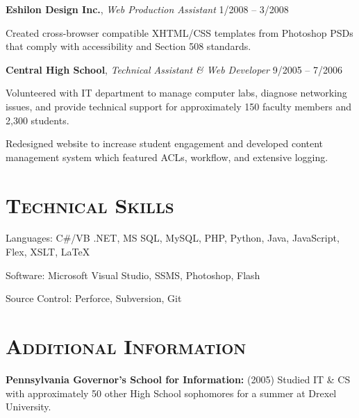 \documentclass[12pt,a4paper]{article}
\newcommand{\sectionhead}{\normalfont\normalsize\scshape}
\newcommand{\li}{\item[--]}
\newcommand{\workhead}[3]{\textbf{#1}, \emph{#2} \hfill #3}
\begin{document}
\begin{description}[leftmargin=1em]
    \item
        \workhead{Eshilon Design Inc.}{Web Production Assistant}{1/2008 -- 3/2008}
        \begin{itemize*}
            \li Created cross-browser compatible XHTML/CSS templates from Photoshop PSDs that comply with accessibility and Section 508 standards.
        \end{itemize*}

    \item
        \workhead{Central High School}{Technical Assistant \& Web Developer}{9/2005 -- 7/2006}
        \begin{itemize*}
            \li Volunteered with IT department to manage computer labs, diagnose networking issues, and provide technical support for approximately 150 faculty members and 2,300 students.
            \li Redesigned website to increase student engagement and developed content management system which featured ACLs, workflow, and extensive logging.
        \end{itemize*}

\end{description}

\section*{\sectionhead Technical Skills}
\begin{description*}
    \item Languages: C\#/VB .NET, MS SQL, MySQL, PHP, Python, Java, JavaScript, Flex, XSLT, \LaTeX
    \item Software: Microsoft Visual Studio, SSMS, Photoshop, Flash
    \item Source Control: Perforce, Subversion, Git
\end{description*}

\section*{\sectionhead Additional Information}
\begin{itemize*}
    \item \textbf{Pennsylvania Governor's School for Information:} (2005) Studied IT \& CS with approximately 50 other High School sophomores for a summer at Drexel University.
\end{itemize*}
\end{document}
